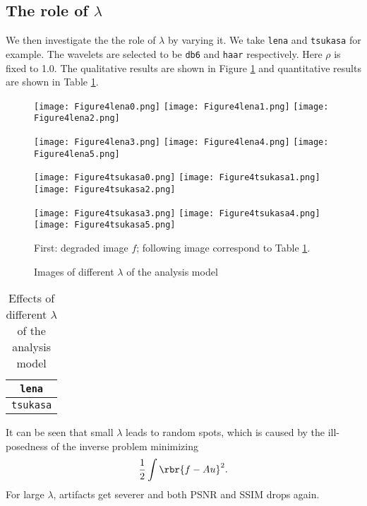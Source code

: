 \documentclass[english, nochinese]{pnote}
\begin{document}
\subsection{The role of $\lambda$}

We then investigate the the role of $\lambda$ by varying it. We take \verb"lena" and \verb"tsukasa" for example. The wavelets are selected to be \verb"db6" and \verb"haar" respectively. Here $\rho$ is fixed to 1.0. The qualitative results are shown in Figure \ref{Fig:AnaLam} and quantitative results are shown in Table \ref{Tbl:AnaLam}.

\begin{figure}[htbp]
{
\centering

\texttt{[image: Figure4lena0.png]}
\texttt{[image: Figure4lena1.png]}
\texttt{[image: Figure4lena2.png]}

\texttt{[image: Figure4lena3.png]}
\texttt{[image: Figure4lena4.png]}
\texttt{[image: Figure4lena5.png]}

\texttt{[image: Figure4tsukasa0.png]}
\texttt{[image: Figure4tsukasa1.png]}
\texttt{[image: Figure4tsukasa2.png]}

\texttt{[image: Figure4tsukasa3.png]}
\texttt{[image: Figure4tsukasa4.png]}
\texttt{[image: Figure4tsukasa5.png]}

\caption{Images of different $\lambda$ of the analysis model}
\label{Fig:AnaLam}
}
{
\footnotesize First: degraded image $f$; following image correspond to Table \ref{Tbl:AnaLam}.
}
\end{figure}

\begin{table}[htbp]
\centering
\begin{tabular}{|c|c|c|c|c|c|c|}
\hline
\multicolumn{7}{|c|}{\texttt{lena}} \\
\hline

\multicolumn{7}{|c|}{\texttt{tsukasa}} \\
\hline

\end{tabular}
\caption{Effects of different $\lambda$ of the analysis model}
\label{Tbl:AnaLam}
\end{table}

It can be seen that small $\lambda$ leads to random spots, which is caused by the ill-posedness of the inverse problem minimizing
\begin{equation}
\frac{1}{2} \int \rbr{ f - A u }^2.
\end{equation}
For large $\lambda$, artifacts get severer and both PSNR and SSIM drops again.
\end{document}
